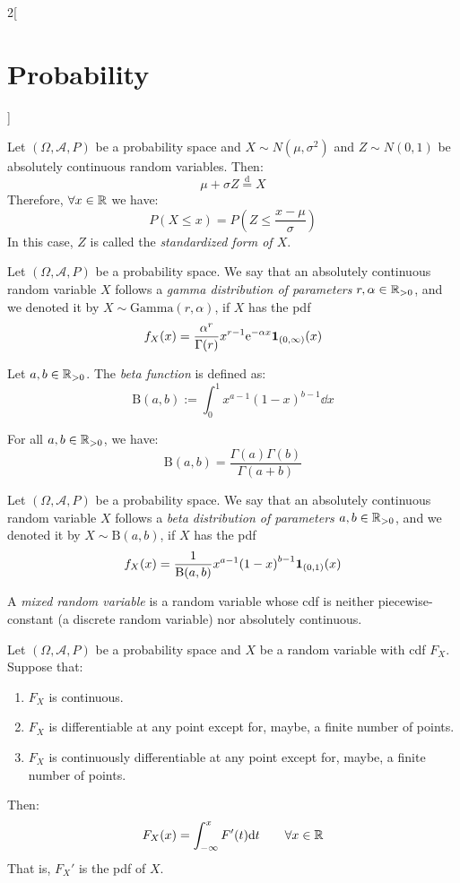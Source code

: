 \documentclass[../../../main.tex]{subfiles}
\begin{document}
\begin{multicols}{2}[\section{Probability}]
\begin{definition}
  \end{definition}
  \begin{prop}
    Let $(\Omega,\mathcal{A},P)$ be a probability space and $X\sim N(\mu,\sigma^2)$ and $Z\sim N(0,1)$ be absolutely continuous random variables. Then: $$\mu+\sigma Z\overset{\text{d}}{=} X$$ Therefore, $\forall x\in\mathbb{R}$ we have: $$P(X\leq x)=P\left(Z\leq\frac{x-\mu}{\sigma}\right)$$ In this case, $Z$ is called the \textit{standardized form of $X$}.
  \end{prop}
  \begin{definition}
    Let $(\Omega,\mathcal{A},P)$ be a probability space. We say that an absolutely continuous random variable $X$ follows a \textit{gamma distribution of parameters $r,\alpha\in\mathbb{R}_{>0}$}, and we denoted it by $X\sim \text{Gamma}(r,\alpha)$, if $X$ has the pdf $$f_X(x)=\frac{\alpha^r}{\Gamma(r)}x^{r-1}\mathrm{e}^{-\alpha x}\boldsymbol{\mathrm{1}}_{(0,\infty)}(x)$$
  \end{definition}
  \begin{definition}
    Let $a,b\in\mathbb{R}_{>0}$. The \textit{beta function} is defined as: $$\text{B}(a,b):=\int_0^1x^{a-1}{(1-x)}^{b-1}\dd x$$
  \end{definition}
  \begin{prop}
    For all $a,b\in\mathbb{R}_{>0}$, we have: $$\text{B}(a,b)=\frac{\Gamma(a)\Gamma(b)}{\Gamma(a+b)}$$
  \end{prop}
  \begin{definition}
    Let $(\Omega,\mathcal{A},P)$ be a probability space. We say that an absolutely continuous random variable $X$ follows a \textit{beta distribution of parameters $a,b\in\mathbb{R}_{>0}$}, and we denoted it by $X\sim \text{B}(a,b)$, if $X$ has the pdf $$f_X(x)=\frac{1}{\text{B}(a,b)}x^{a-1}{(1-x)}^{b-1}\boldsymbol{\mathrm{1}}_{(0,1)}(x)$$
  \end{definition}
  \begin{definition}
    A\textit{ mixed random variable} is a random variable whose cdf is neither piecewise-constant (a discrete random variable) nor absolutely  continuous.
  \end{definition}
  \begin{theorem}
    Let $(\Omega,\mathcal{A},P)$ be a probability space and $X$ be a random variable with cdf $F_X$. Suppose that:
    \begin{enumerate}
      \item $F_X$ is continuous.
      \item $F_X$ is differentiable at any point except for, maybe, a finite number of points.
      \item $F_X$ is continuously differentiable at any point except for, maybe, a finite number of points.
    \end{enumerate}
    Then: $$F_X(x)=\int_{-\infty}^xF'(t)\dd t\qquad\forall x\in\mathbb{R}$$
    That is, ${F_X}'$ is the pdf of $X$.
  \end{theorem}

\end{multicols}
\end{document}
